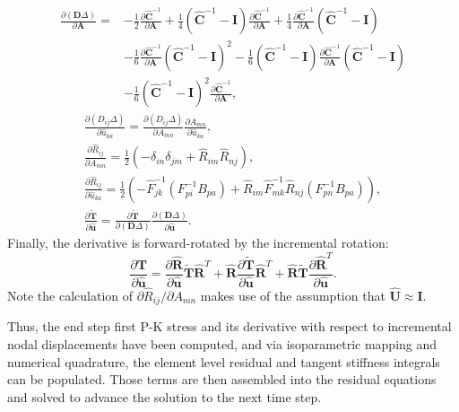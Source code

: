 \vspace{-15mm}
\begin{equation}
\begin{aligned}
\frac{\partial ({\bm D}\Delta)}{\partial {\bm A}} = &-\frac{1}{2}\frac{\partial {\hat{\bm C}^{-1}}}{\partial \bm A} + \frac{1}{4}({\hat{\bm C}}^{-1} - {\bm I})\frac{\partial \hat{\bm C}^{-1}}{\partial {\bm A}} + \frac{1}{4}\frac{\partial \hat{\bm C}^{-1}}{\partial {\bm A}}({\hat{\bm C}}^{-1} - {\bm I}) \\
&-\frac{1}{6} \frac{\partial {\hat{\bm C}^{-1}}}{\partial \bm A} (\hat{\bm C}^{-1} - {\bm I})^{2} - \frac{1}{6}  (\hat{\bm C}^{-1} - {\bm I}) \frac{\partial {\hat{\bm C}^{-1}}}{\partial \bm A} (\hat{\bm C}^{-1} - {\bm I}) \\
&- \frac{1}{6}(\hat{\bm C}^{-1} - {\bm I})^{2} \frac{\partial {\hat{\bm C}^{-1}}}{\partial \bm A},
\end{aligned}
\end{equation}
\begin{gather}
\frac{\partial (D_{ij}\Delta)}{\partial \hat{u}_{ka}} = \frac{\partial (D_{ij}\Delta)}{\partial A_{mn}}\frac{\partial A_{mn}}{\partial \hat{u}_{ka}}, \\
\frac{\partial \hat{R}_{ij}}{\partial A_{mn}} = \frac{1}{2}(-\delta_{in}\delta_{jm} + \hat{R}_{im}\hat{R}_{nj}), \\
\frac{\partial \hat{R}_{ij}}{\partial \hat{u}_{ka}} = \frac{1}{2}\left(-\hat{F}_{jk}^{-1}(F_{pi}^{-1}B_{pa}) + \hat{R}_{im}\hat{F}_{mk}^{-1}\hat{R}_{nj}(F_{pn}^{-1}B_{pa})\right), \\
\frac{\partial \tilde{\bm T}}{\partial \hat{\bm u}} = \frac{\partial \tilde{\bm T}}{\partial ({\bm D}\Delta)}\frac{\partial ({\bm D}\Delta)}{\partial \hat{\bm u}}.
\end{gather}
Finally, the derivative is forward-rotated by the incremental rotation:
\begin{equation}
\frac{\partial {\bm T}}{\partial \hat{\bm u}} = \frac{\partial \hat{\bm R}}{\partial \hat{\bm u}}{\tilde {\bm T}}{\hat{\bm R}}^{T} + {\hat{\bm R}}\frac{\partial \tilde{\bm T}}{\partial \hat{\bm u}}\hat{\bm R}^T + \hat{\bm R}\tilde{\bm T}\frac{\partial \hat{\bm R}^{T}}{\partial \hat{\bm u}}.
\end{equation}
Note the calculation of ${\partial \hat{R}_{ij}}/{\partial A_{mn}}$ makes use of the assumption that $\hat{\bm{U}} \approx \bm{I}$.

Thus, the end step first P-K stress and its derivative with respect to incremental nodal displacements have been computed, and via isoparametric mapping and numerical quadrature, the element level residual and tangent stiffness integrals can be populated. Those terms are then assembled into the residual equations and solved to advance the solution to the next time step.

